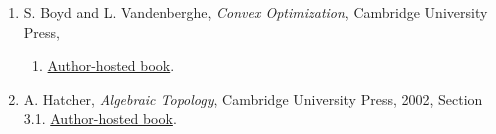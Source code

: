 \documentclass[
]{article}
\providecommand{\tightlist}{%
  \setlength{\itemsep}{0pt}\setlength{\parskip}{0pt}}
\begin{document}
\begin{enumerate}
\def\labelenumi{\arabic{enumi}.}
\tightlist
\item
  S. Boyd and L. Vandenberghe, \emph{Convex Optimization}, Cambridge
  University Press,

  \begin{enumerate}
  \def\labelenumii{\arabic{enumii}.}
  \setcounter{enumii}{2003}
  \tightlist
  \item
    \href{https://web.stanford.edu/~boyd/cvxbook/}{Author-hosted book}.
  \end{enumerate}
\item
  A. Hatcher, \emph{Algebraic Topology}, Cambridge University Press,
  2002, Section 3.1.
  \href{https://pi.math.cornell.edu/~hatcher/AT/ATpage.html}{Author-hosted
  book}.
\end{enumerate}
\end{document}
